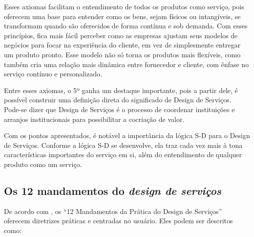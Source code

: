 Esses axiomas facilitam o entendimento de todos os produtos como serviço, pois oferecem uma base para entender como os bens, sejam físicos ou intangíveis, se transformam quando são oferecidos de forma contínua e sob demanda. Com esses princípios, fica mais fácil perceber como as empresas ajustam seus modelos de negócios para focar na experiência do cliente, em vez de simplesmente entregar um produto pronto. Esse modelo não só torna os produtos mais flexíveis, como também cria uma relação mais dinâmica entre fornecedor e cliente, com ênfase no serviço contínuo e personalizado.

Entre esses axiomas, o 5º ganha um destaque importante, pois a partir dele, é possível construir uma definição direta do significado de Design de Serviços. Pode-se dizer que Design de Serviços é o processo de coordenar instituições e arranjos institucionais para possibilitar a cocriação de valor.

Com os pontos apresentados, é notável a importância da lógica S-D para o Design de Serviços. Conforme a lógica S-D se desenvolve, ela traz cada vez mais à tona características importantes do serviço em si, além do entendimento de qualquer produto como um serviço.

\subsection{Os 12 mandamentos do \textit{design de serviços}}

De acordo com \cite{Stickdorn2019}, os ``12 Mandamentos da Prática do Design de Serviços'' oferecem diretrizes práticas e centradas no usuário. Eles podem ser descritos como:

